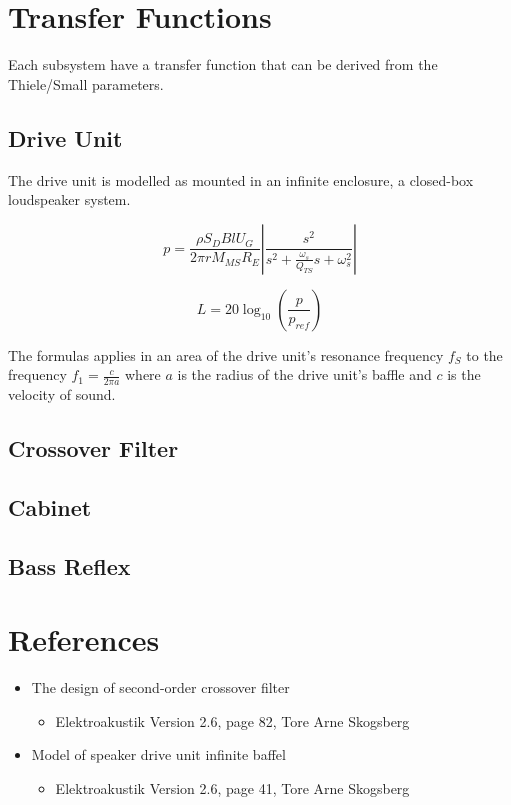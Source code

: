 \section{Transfer Functions}
Each subsystem have a transfer function that can be derived from the Thiele/Small parameters.
\subsection{Drive Unit}
The drive unit is modelled as mounted in an infinite enclosure, a closed-box loudspeaker system. 

\begin{equation}
p = \frac{\rho S_D B l U_G}{2\pi r M_{MS} R_E}\left|\frac{s^2}{s^2 + \frac{\omega_s}{Q_{TS}}s+\omega_s^2}\right|
\label{eq:transdriveunit}
\end{equation}

\begin{equation}
L=20\log_{10}\left(\frac{p}{p_{ref}}\right)
\label{eq:soundpressure}
\end{equation}

The formulas applies in an area of the drive unit's resonance frequency $f_S$ to the frequency $f_1=\frac{c}{2\pi a}$ where $a$ is the radius of the drive unit's baffle and $c$ is the velocity of sound.\cite[p.~41]{Elektroakustik}

\subsection{Crossover Filter}

\subsection{Cabinet}

\subsection{Bass Reflex}

\section{References}
\begin{itemize}
	\item The design of second-order crossover filter
	\begin{itemize}
		\item Elektroakustik Version 2.6, page 82, Tore Arne Skogsberg
	\end{itemize}
	\item Model of speaker drive unit infinite baffel
	\begin{itemize}
		\item Elektroakustik Version 2.6, page 41, Tore Arne Skogsberg
	\end{itemize}
\end{itemize}



\FloatBarrier
